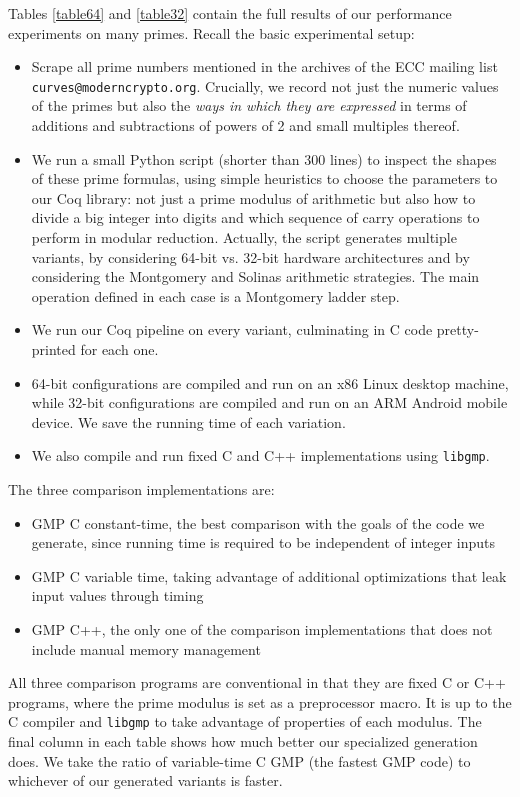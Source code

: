 \documentclass[conference,letterpaper]{IEEEtran}
\begin{document}
Tables \ref{table64} and \ref{table32} contain the full results of our performance experiments on many primes.
Recall the basic experimental setup:
\begin{itemize}
\item Scrape all prime numbers mentioned in the archives of the ECC mailing list \texttt{curves@moderncrypto.org}.  Crucially, we record not just the numeric values of the primes but also the \emph{ways in which they are expressed} in terms of additions and subtractions of powers of 2 and small multiples thereof.
\item We run a small Python script (shorter than 300 lines) to inspect the shapes of these prime formulas, using simple heuristics to choose the parameters to our Coq library: not just a prime modulus of arithmetic but also how to divide a big integer into digits and which sequence of carry operations to perform in modular reduction.  Actually, the script generates multiple variants, by considering 64-bit vs. 32-bit hardware architectures and by considering the Montgomery and Solinas arithmetic strategies.  The main operation defined in each case is a Montgomery ladder step.
\item We run our Coq pipeline on every variant, culminating in C code pretty-printed for each one.
\item 64-bit configurations are compiled and run on an x86 Linux desktop machine, while 32-bit configurations are compiled and run on an ARM Android mobile device.  We save the running time of each variation.
\item We also compile and run fixed C and C++ implementations using \texttt{libgmp}.
\end{itemize}

The three comparison implementations are:
\begin{itemize}
\item GMP C constant-time, the best comparison with the goals of the code we generate, since running time is required to be independent of integer inputs
\item GMP C variable time, taking advantage of additional optimizations that leak input values through timing
\item GMP C++, the only one of the comparison implementations that does not include manual memory management
\end{itemize}

All three comparison programs are conventional in that they are fixed C or C++ programs, where the prime modulus is set as a preprocessor macro.
It is up to the C compiler and \texttt{libgmp} to take advantage of properties of each modulus.
The final column in each table shows how much better our specialized generation does.
We take the ratio of variable-time C GMP (the fastest GMP code) to whichever of our generated variants is faster.
\end{document}
